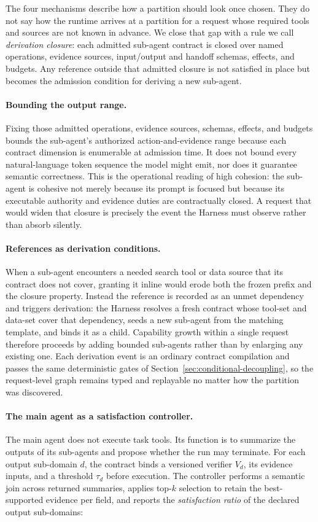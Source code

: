 The four mechanisms describe how a partition should look once chosen. They do not say how the runtime arrives at a partition for a request whose required tools and sources are not known in advance. We close that gap with a rule we call \textit{derivation closure}: each admitted sub-agent contract is closed over named operations, evidence sources, input/output and handoff schemas, effects, and budgets. Any reference outside that admitted closure is not satisfied in place but becomes the admission condition for deriving a new sub-agent.

\paragraph{Bounding the output range.}
Fixing those admitted operations, evidence sources, schemas, effects, and budgets bounds the sub-agent's authorized action-and-evidence range because each contract dimension is enumerable at admission time. It does not bound every natural-language token sequence the model might emit, nor does it guarantee semantic correctness. This is the operational reading of high cohesion: the sub-agent is cohesive not merely because its prompt is focused but because its executable authority and evidence duties are contractually closed. A request that would widen that closure is precisely the event the Harness must observe rather than absorb silently.

\paragraph{References as derivation conditions.}
When a sub-agent encounters a needed search tool or data source that its contract does not cover, granting it inline would erode both the frozen prefix and the closure property. Instead the reference is recorded as an unmet dependency and triggers derivation: the Harness resolves a fresh contract whose tool-set and data-set cover that dependency, seeds a new sub-agent from the matching template, and binds it as a child. Capability growth within a single request therefore proceeds by adding bounded sub-agents rather than by enlarging any existing one. Each derivation event is an ordinary contract compilation and passes the same deterministic gates of Section~\ref{sec:conditional-decoupling}, so the request-level graph remains typed and replayable no matter how the partition was discovered.

\paragraph{The main agent as a satisfaction controller.}
The main agent does not execute task tools. Its function is to summarize the outputs of its sub-agents and propose whether the run may terminate. For each output sub-domain $d$, the contract binds a versioned verifier $V_d$, its evidence inputs, and a threshold $\tau_d$ before execution. The controller performs a semantic join across returned summaries, applies top-$k$ selection to retain the best-supported evidence per field, and reports the \textit{satisfaction ratio} of the declared output sub-domains:

